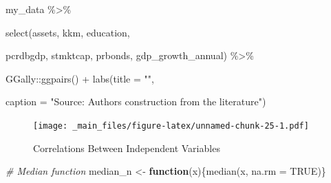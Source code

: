 \documentclass[a4paper,nobind]{templates/ociamthesis}
\newenvironment{Shaded}{\begin{snugshade}}{\end{snugshade}}
\newcommand{\AttributeTok}[1]{\textcolor[rgb]{0.77,0.63,0.00}{#1}}
\newcommand{\CommentTok}[1]{\textcolor[rgb]{0.56,0.35,0.01}{\textit{#1}}}
\newcommand{\ConstantTok}[1]{\textcolor[rgb]{0.00,0.00,0.00}{#1}}
\newcommand{\ControlFlowTok}[1]{\textcolor[rgb]{0.13,0.29,0.53}{\textbf{#1}}}
\newcommand{\FunctionTok}[1]{\textcolor[rgb]{0.00,0.00,0.00}{#1}}
\newcommand{\NormalTok}[1]{#1}
\newcommand{\OtherTok}[1]{\textcolor[rgb]{0.56,0.35,0.01}{#1}}
\newcommand{\SpecialCharTok}[1]{\textcolor[rgb]{0.00,0.00,0.00}{#1}}
\newcommand{\StringTok}[1]{\textcolor[rgb]{0.31,0.60,0.02}{#1}}
\renewenvironment{Shaded}
{
  \vspace{10pt}%
  \begin{snugshade}%
}{%
  \end{snugshade}%
  \vspace{8pt}%
}
\begin{document}
\begin{landscape}

\begin{Shaded}
\begin{Highlighting}[]
\NormalTok{my\_data }\SpecialCharTok{\%\textgreater{}\%}
  
  \FunctionTok{select}\NormalTok{(assets, kkm, education, }
         
\NormalTok{         pcrdbgdp, stmktcap, prbonds, gdp\_growth\_annual) }\SpecialCharTok{\%\textgreater{}\%} 
  
\NormalTok{         GGally}\SpecialCharTok{::}\FunctionTok{ggpairs}\NormalTok{() }\SpecialCharTok{+} \FunctionTok{labs}\NormalTok{(}\AttributeTok{title =} \StringTok{""}\NormalTok{, }
                                  
                                  \AttributeTok{caption =} \StringTok{"Source: Authors\textquotesingle{} construction from the literature"}\NormalTok{)}
\end{Highlighting}
\end{Shaded}

\begin{figure}
\centering
\texttt{[image: \_main\_files/figure-latex/unnamed-chunk-25-1.pdf]}
\caption{\label{fig:unnamed-chunk-25}Correlations Between Independent Variables}
\end{figure}

\begin{Shaded}
\begin{Highlighting}[]
\CommentTok{\# Median function}
\NormalTok{median\_n }\OtherTok{\textless{}{-}} \ControlFlowTok{function}\NormalTok{(x)\{}\FunctionTok{median}\NormalTok{(x, }\AttributeTok{na.rm =} \ConstantTok{TRUE}\NormalTok{)\}}
\end{Highlighting}
\end{Shaded}


\end{landscape}
\end{document}
